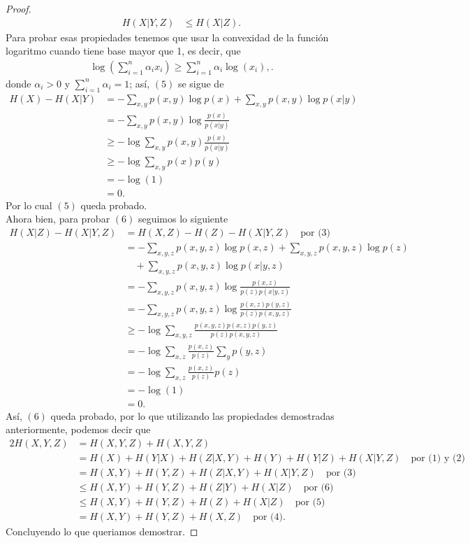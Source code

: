 \begin{enumerate}
\begin{proof}
\begin{align}
 H(X|Y,Z)&\leq H(X|Z)
.\end{align}
Para probar esas propiedades tenemos que usar la convexidad de la función logaritmo cuando tiene base mayor que 1, es decir, que 
\begin{align*}
 \log\left(\sum_{i=1}^{n} \alpha_i x_i\right) \geq \sum_{i=1}^{n} \alpha_i \log(x_i),   
.\end{align*}
donde $\alpha_i > 0$ y $\sum_{i=1}^{n} \alpha_i = 1$; así, $(5)$ se sigue de 
\begin{align*}
H(X) - H(X|Y) &= -\sum_{x,y} p(x,y) \log p(x) + \sum_{x,y} p(x,y) \log p(x|y) \\
&= -\sum_{x,y} p(x,y) \log \frac{p(x)}{p(x|y)} \\
&\geq -\log \sum_{x,y} p(x,y) \frac{p(x)}{p(x|y)} \\
&\geq -\log \sum_{x,y} p(x)p(y) \\
&= -\log(1)\\
&= 0.
\end{align*}
Por lo cual $(5)$ queda probado.\\
Ahora bien, para probar $(6)$ seguimos lo siguiente 
\begin{align*}
H(X|Z) - H(X|Y,Z) 
&= H(X,Z) - H(Z) - H(X|Y,Z) \quad \text{por (3)} \\
&= -\sum_{x,y,z} p(x,y,z) \log p(x,z) + \sum_{x,y,z} p(x,y,z) \log p(z) \\
&\quad + \sum_{x,y,z} p(x,y,z) \log p(x|y,z) \\
&= -\sum_{x,y,z} p(x,y,z) \log \frac{p(x,z)}{p(z)p(x|y,z)} \\
&= -\sum_{x,y,z} p(x,y,z) \log \frac{p(x,z)p(y,z)}{p(z)p(x,y,z)} \\
&\geq -\log \sum_{x,y,z} \frac{p(x,y,z) p(x,z)p(y,z)}{p(z)p(x,y,z)} \\
&= -\log \sum_{x,z} \frac{p(x,z)}{p(z)} \sum_{y} p(y,z) \\
&= -\log \sum_{x,z} \frac{p(x,z)}{p(z)} p(z) \\
&= -\log(1)\\ 
&= 0
.\end{align*}
Así, $(6)$ queda probado, por lo que utilizando las propiedades demostradas anteriormente, podemos decir que 
\begin{align*}
    2H(X,Y,Z)&=H(X,Y,Z)+H(X,Y,Z)\\
    &=H(X)+H(Y|X)+H(Z|X,Y)+H(Y)+H(Y|Z)+H(X|Y,Z) \quad \text{por (1) y (2)}\\
    &=H(X,Y)+H(Y,Z)+H(Z|X,Y)+H(X|Y,Z) \quad \text{por (3)}\\
    &\leq H(X,Y)+H(Y,Z)+H(Z|Y)+H(X|Z) \quad \text{por (6)}\\
    &\leq H(X,Y)+H(Y,Z)+H(Z)+H(X|Z) \quad \text{por (5)}\\
    &= H(X,Y)+H(Y,Z)+H(X,Z) \quad \text{por (4)}
.\end{align*}
Concluyendo lo que queriamos demostrar.


\end{proof}
\end{enumerate}
